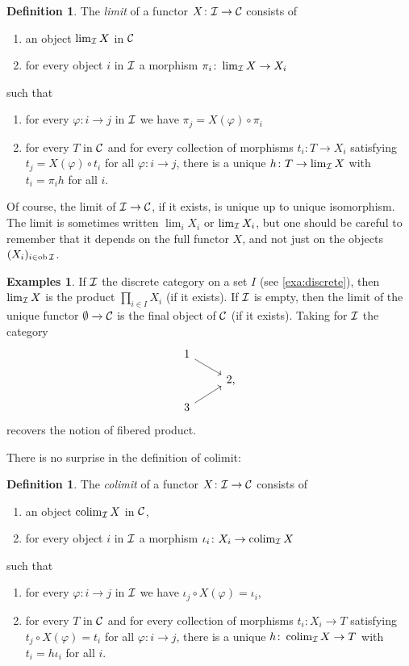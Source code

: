 \documentclass[11pt]{amsbook}
\DeclareMathOperator\ob{ob}
\DeclareMathOperator\colim{colim}
\theoremstyle{plain}
\theoremstyle{definition}
\newtheorem{definition}[theorem]{Definition}
\newtheorem{examples}[theorem]{Examples}
\begin{document}
\begin{definition}The \emph{limit} of a functor $X\colon {\mathcal{I}} \to {\mathcal{C}}$  consists of
\begin{enumerate}
\item an object $\lim_{\mathcal{I}} X$ in ${\mathcal{C}}$
\item for every object $i$ in ${\mathcal{I}}$ a morphism $\pi_i \colon \lim_{\mathcal{I}} X \to X_i$
\end{enumerate}
such that
\begin{enumerate}
\item for every $\varphi\colon i \to j$ in ${\mathcal{I}}$ we have $\pi_j = X(\varphi) \circ \pi_i$
\item for every $T$ in ${\mathcal{C}}$ and for every collection of morphisms $t_i\colon T\to X_i$ satisfying $t_j = X(\varphi) \circ t_i$ for all $\varphi\colon i\to j$, there is a unique $h\colon T\to \lim_{\mathcal{I}} X$ with $t_i = \pi_i h$ for all $i$.
\end{enumerate}
\end{definition}

Of course, the limit of ${\mathcal{I}} \to {\mathcal{C}}$, if it exists, is unique up to unique isomorphism. The limit is sometimes written $\lim_i X_i$ or $\lim_{\mathcal{I}} X_i$, but one should be careful to remember that it depends on the full functor $X$, and not just on the objects $(X_i)_{i \in \ob \cI}$.


\begin{examples}\label{exa:three-limits}
If ${\mathcal{I}}$ the discrete category on a set $I$ (see \ref{exa:discrete}), then $\lim_{\mathcal{I}} X$ is the product $\prod_{i\in I} X_i$ (if it exists). If ${\mathcal{I}}$ is empty, then the limit of the unique functor $\emptyset\to {\mathcal{C}}$ is the final object of ${\mathcal{C}}$ (if it exists). Taking for ${\mathcal{I}}$ the category
\[
\begin{tikzcd}[row sep=small]
	1 \arrow{rd} & \\  & 2, \\ 3 \arrow{ru} & 
\end{tikzcd}
\]
recovers the notion of  fibered product.  
\end{examples}


There is no surprise in the definition of colimit: 

\begin{definition}The \emph{colimit} of a functor $X\colon {\mathcal{I}} \to {\mathcal{C}}$  consists of
\begin{enumerate}
\item an object $\colim_\cI X$ in ${\mathcal{C}}$,
\item for every object $i$ in ${\mathcal{I}}$ a morphism $\iota_i \colon X_i \to \colim_\cI X$
\end{enumerate}
such that
\begin{enumerate}
\item for every $\varphi\colon i \to j$ in ${\mathcal{I}}$ we have $\iota_j \circ X(\varphi) = \iota_i$,
\item for every $T$ in ${\mathcal{C}}$ and for every collection of morphisms $t_i\colon X_i\to T$ satisfying $t_j \circ X(\varphi) = t_i$ for all $\varphi\colon i\to j$, there is a unique $h\colon \colim_\cI X\to T$ with $t_i = h \iota_i$ for all $i$.
\end{enumerate}
\end{definition}
\end{document}
